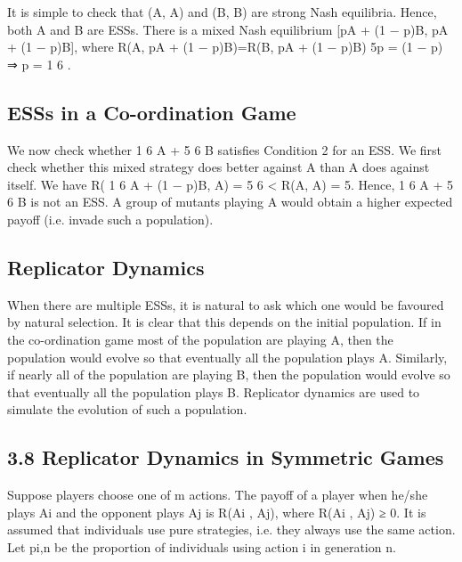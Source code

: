 \documentclass[]{report}
\begin{document}
	It is simple to check that (A, A) and (B, B) are strong Nash
	equilibria.
	Hence, both A and B are ESSs.
	There is a mixed Nash equilibrium [pA + (1 − p)B, pA + (1 − p)B],
	where
	R(A, pA + (1 − p)B)=R(B, pA + (1 − p)B)
	5p = (1 − p) ⇒ p =
	1
	6
	.
	
	\subsection{ESSs in a Co-ordination Game}
	We now check whether 1
	6
	A +
	5
	6
	B satisfies Condition 2 for an ESS.
	We first check whether this mixed strategy does better against A
	than A does against itself. We have
	R(
	1
	6
	A + (1 − p)B, A) = 5
	6
	< R(A, A) = 5.
	Hence, 1
	6
	A +
	5
	6
	B is not an ESS. A group of mutants playing A
	would obtain a higher expected payoff (i.e. invade such a
	population).
	\subsection{Replicator Dynamics}
	When there are multiple ESSs, it is natural to ask which one would
	be favoured by natural selection.
	It is clear that this depends on the initial population. If in the
	co-ordination game most of the population are playing A, then the
	population would evolve so that eventually all the population plays
	A.
	Similarly, if nearly all of the population are playing B, then the
	population would evolve so that eventually all the population plays
	B.
	Replicator dynamics are used to simulate the evolution of such a
	population.
	
	\subsection{3.8 Replicator Dynamics in Symmetric Games}
	Suppose players choose one of m actions. The payoff of a player
	when he/she plays Ai and the opponent plays Aj
	is R(Ai
	, Aj),
	where R(Ai
	, Aj) ≥ 0.
	It is assumed that individuals use pure strategies, i.e. they always
	use the same action.
	Let pi,n be the proportion of individuals using action i in
	generation n.
\end{document}
